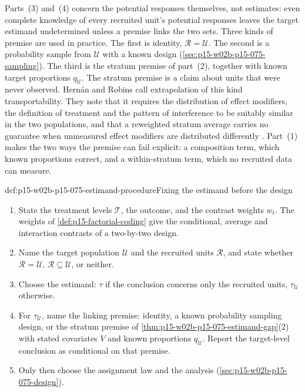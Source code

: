Parts~(3) and~(4) concern the potential responses themselves, not estimates:
even complete knowledge of every recruited unit's potential responses leaves the
target estimand undetermined unless a premise links the two sets. Three kinds
of premise are used in practice. The first is identity, \(\mathcal R=\mathcal U\).
The second is a probability sample from \(\mathcal U\) with a known design
(\cref{sec:p15-w02b-p15-075-sampling}). The third is the stratum premise of
part~(2), together with known target proportions \(q_{\mathcal U}\). The
stratum premise is a claim about units that were never observed. Hern\'an and
Robins call extrapolation of this kind transportability. They note that it
requires the distribution of effect modifiers, the definition of treatment and
the pattern of interference to be suitably similar in the two populations, and
that a reweighted stratum average carries no guarantee when unmeasured
effect modifiers are distributed differently \cite[\S4.3, p.~52; Fine
Point~4.2, p.~54]{HernanRobins2020WhatIf2026}. Part~(1) makes the two ways the
premise can fail explicit: a composition term, which known proportions
correct, and a within-stratum term, which no recruited data can measure.

\begin{hbmethod}{def:p15-w02b-p15-075-estimand-procedure}{Fixing the estimand before the design}
\begin{enumerate}
\item State the treatment levels \(\mathcal T\), the outcome, and the contrast
weights \(w_t\). The weights of \cref{def:p15-factorial-coding} give the
conditional, average and interaction contrasts of a two-by-two design.
\item Name the target population \(\mathcal U\) and the recruited units
\(\mathcal R\), and state whether \(\mathcal R=\mathcal U\),
\(\mathcal R\subseteq\mathcal U\), or neither.
\item Choose the estimand: \(\tau\) if the conclusion concerns only the
recruited units, \(\tau_{\mathcal U}\) otherwise.
\item For \(\tau_{\mathcal U}\), name the linking premise: identity, a known
probability sampling design, or the stratum premise of
\cref{thm:p15-w02b-p15-075-estimand-gap}(2) with stated covariates \(V\) and
known proportions \(q_{\mathcal U}\). Report the target-level conclusion as
conditional on that premise.
\item Only then choose the assignment law and the analysis
(\cref{sec:p15-w02b-p15-075-design}).
\end{enumerate}
\end{hbmethod}

